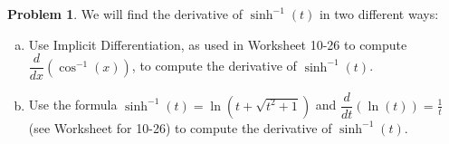\documentclass[11pt,reqno,final]{amsart}
\numberwithin{equation}{section}
\numberwithin{figure}{section}
\theoremstyle{definition} %
\newtheorem{question}{Problem}
\begin{document}
\begin{question}
        We will find the derivative of $\sinh^{-1}(t)$ in two different ways:
        \begin{enumerate}[(a)]
        \item Use Implicit Differentiation, as used in Worksheet 10-26 to compute $\dfrac{d}{dx}(\cos^{-1}(x))$,
                to compute the derivative of $\sinh^{-1}(t)$.
        \item Use the formula $\sinh^{-1}(t) = \ln\left(t + \sqrt{t^2+1}\right)$ and $\dfrac{d}{dt}(\ln(t)) = \frac{1}{t}$ (see Worksheet for 10-26)
                to compute the derivative of $\sinh^{-1}(t)$.
        \end{enumerate}
\end{question}
\end{document}

